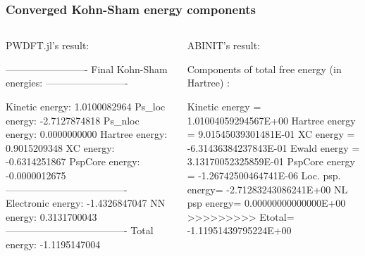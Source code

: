 \documentclass[english,9pt]{beamer}
\begin{document}
\begin{frame}[fragile]
\frametitle{Converged Kohn-Sham energy components}

\begin{columns}

\begin{column}{0.45\textwidth}
PWDFT.jl's result:
\begin{textcode}
-------------------------
Final Kohn-Sham energies:
-------------------------

Kinetic    energy:       1.0100082964
Ps_loc     energy:      -2.7127874818
Ps_nloc    energy:       0.0000000000
Hartree    energy:       0.9015209348
XC         energy:      -0.6314251867
PspCore    energy:      -0.0000012675
-------------------------------------
Electronic energy:      -1.4326847047
NN         energy:       0.3131700043
-------------------------------------
Total      energy:      -1.1195147004
\end{textcode}
\end{column}

\begin{column}{0.55\textwidth}

ABINIT's result:
\begin{textcode}
Components of total free energy (in Hartree) :

   Kinetic energy  =  1.01004059294567E+00
   Hartree energy  =  9.01545039301481E-01
   XC energy       = -6.31436384237843E-01
   Ewald energy    =  3.13170052325859E-01
   PspCore energy  = -1.26742500464741E-06
   Loc. psp. energy= -2.71283243086241E+00
   NL   psp  energy=  0.00000000000000E+00
   >>>>>>>>> Etotal= -1.11951439795224E+00
\end{textcode}
\end{column}

\end{columns}

\end{frame}
\end{document}
